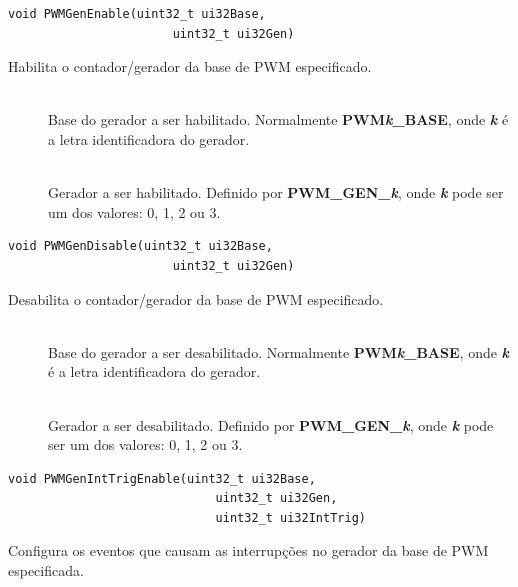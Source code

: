 \begin{lstlisting}[style=funcao]
	void PWMGenEnable(uint32_t ui32Base,
					   uint32_t ui32Gen)
\end{lstlisting}

Habilita o contador/gerador da base de PWM especificado.

\begin{description}
	\item []\hfill \\
	Base do gerador a ser habilitado. Normalmente \textbf{PWM\emph{k}\_BASE}, onde \textbf{\emph{k}} é a letra identificadora do gerador.
	
	\item []\hfill \\
	Gerador a ser habilitado. Definido por \textbf{PWM\_GEN\_\emph{k}}, onde \textbf{\emph{k}} pode ser um dos valores: 0, 1, 2 ou 3.
\end{description}

\begin{lstlisting}[style=funcao]
	void PWMGenDisable(uint32_t ui32Base,
					   uint32_t ui32Gen)
\end{lstlisting}

Desabilita o contador/gerador da base de PWM especificado.

\begin{description}
	\item []\hfill \\
	Base do gerador a ser desabilitado. Normalmente \textbf{PWM\emph{k}\_BASE}, onde \textbf{\emph{k}} é a letra identificadora do gerador.
	
	\item []\hfill \\
	Gerador a ser desabilitado. Definido por \textbf{PWM\_GEN\_\emph{k}}, onde \textbf{\emph{k}} pode ser um dos valores: 0, 1, 2 ou 3.
\end{description}

\begin{lstlisting}[style=funcao]
	void PWMGenIntTrigEnable(uint32_t ui32Base,
							 uint32_t ui32Gen,
							 uint32_t ui32IntTrig)
\end{lstlisting}

Configura os eventos que causam as interrupções no gerador da base de PWM especificada.


